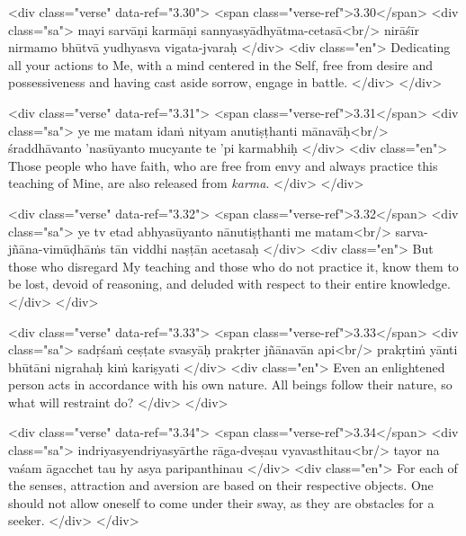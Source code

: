 \begin{html}
<div class="verse" data-ref="3.30">
  <span class="verse-ref">3.30</span>
  <div class="sa">
    mayi sarvāṇi karmāṇi sannyasyādhyātma-cetasā<br/>
    nirāśīr nirmamo bhūtvā yudhyasva vigata-jvaraḥ
  </div>
  <div class="en">
    Dedicating all your actions to Me, with a mind centered in the Self, free from desire and possessiveness and having cast aside sorrow, engage in battle.
  </div>
</div>
\end{html}



\begin{html}
<div class="verse" data-ref="3.31">
  <span class="verse-ref">3.31</span>
  <div class="sa">
    ye me matam idaṁ nityam anutiṣṭhanti mānavāḥ<br/>
    śraddhāvanto ’nasūyanto mucyante te ’pi karmabhiḥ
  </div>
  <div class="en">
    Those people who have faith, who are free from envy and always practice this teaching of Mine, are also released from \textit{karma}.
  </div>
</div>
\end{html}



\begin{html}
<div class="verse" data-ref="3.32">
  <span class="verse-ref">3.32</span>
  <div class="sa">
    ye tv etad abhyasūyanto nānutiṣṭhanti me matam<br/>
    sarva-jñāna-vimūḍhāṁs tān viddhi naṣṭān acetasaḥ
  </div>
  <div class="en">
    But those who disregard My teaching and those who do not practice it, know them to be lost, devoid of reasoning, and deluded with respect to their entire knowledge.
  </div>
</div>
\end{html}



\begin{html}
<div class="verse" data-ref="3.33">
  <span class="verse-ref">3.33</span>
  <div class="sa">
    sadṛśaṁ ceṣṭate svasyāḥ prakṛter jñānavān api<br/>
    prakṛtiṁ yānti bhūtāni nigrahaḥ kiṁ kariṣyati
  </div>
  <div class="en">
    Even an enlightened person acts in accordance with his own nature. All beings follow their nature, so what will restraint do?
  </div>
</div>
\end{html}



\begin{html}
<div class="verse" data-ref="3.34">
  <span class="verse-ref">3.34</span>
  <div class="sa">
    indriyasyendriyasyārthe rāga-dveṣau vyavasthitau<br/>
    tayor na vaśam āgacchet tau hy asya paripanthinau
  </div>
  <div class="en">
    For each of the senses, attraction and aversion are based on their respective objects. One should not allow oneself to come under their sway, as they are obstacles for a seeker.
  </div>
</div>
\end{html}



